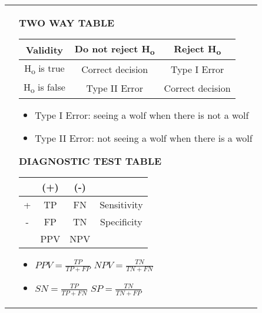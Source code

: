 \documentclass[6pt]{article}
\begin{document}
\begin{footnotesize}
\begin{tabular}{l | l}
{}

&

\parbox{0.5\textwidth}{

\begin{flushright}

\begin{flushleft}
\textbf{TWO WAY TABLE}
\end{flushleft}


\begin{flushleft}
 \begin{tabular}{||c | c | c||} 
 \hline
 Validity & Do not reject H\textsubscript{o} & Reject H\textsubscript{o} \\ [0.5ex] 
 \hline\hline
 H\textsubscript{o} is true & Correct decision & Type I Error $\alpha$ \\ 
 \hline
 H\textsubscript{o} is false & Type II Error $\beta$ & Correct decision \\ 
 \hline
\end{tabular}

\begin{itemize}
\item Type I Error: seeing a wolf when there is not a wolf
\item Type II Error: not seeing a wolf when there is a wolf
\end{itemize}


\begin{flushleft}
\textbf{DIAGNOSTIC TEST TABLE}
\end{flushleft}

 \begin{tabular}{||c | c | c | c||} 
 \hline
  & (+) & (-) & \\
 \hline
 + & TP & FN & Sensitivity \\ [0.5ex] 
 \hline
 - & FP & TN & Specificity \\ 
 \hline
 & PPV & NPV & \\
 \hline
\end{tabular}

\begin{itemize}
\item $PPV = \frac{TP}{TP+FP}$ \quad \quad $NPV = \frac{TN}{TN+FN}$
\item $SN = \frac{TP}{TP+FN}$ \quad \quad $SP = \frac{TN}{TN+FP}$
\end{itemize}

\end{flushleft}
\end{flushright}
}

\end{tabular}


\end{footnotesize}
\end{document}
